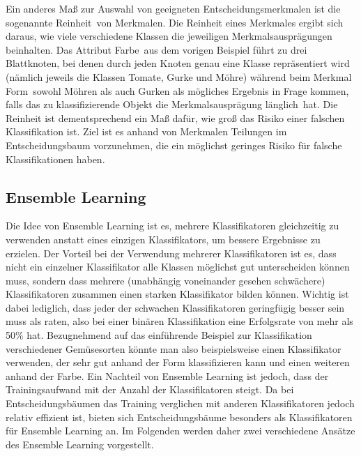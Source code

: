 Ein anderes Maß zur Auswahl von geeigneten Entscheidungsmerkmalen ist die sogenannte \glqq Reinheit\grqq\ von Merkmalen. Die Reinheit eines Merkmales ergibt sich daraus, wie viele verschiedene Klassen die jeweiligen Merkmalsausprägungen beinhalten. Das Attribut \glqq Farbe\grqq\ aus dem vorigen Beispiel führt zu drei Blattknoten, bei denen durch jeden Knoten genau eine Klasse repräsentiert wird (nämlich jeweils die Klassen Tomate, Gurke und Möhre) während beim Merkmal \glqq Form\grqq\ sowohl Möhren als auch Gurken als mögliches Ergebnis in Frage kommen, falls das zu klassifizierende Objekt die Merkmalsausprägung \glqq länglich\grqq\ hat. Die Reinheit ist dementsprechend ein Maß dafür, wie groß das Risiko einer falschen Klassifikation ist. Ziel ist es anhand von Merkmalen Teilungen im Entscheidungsbaum vorzunehmen, die ein möglichst geringes Risiko für falsche Klassifikationen haben.


\subsection{Ensemble Learning}
Die Idee von Ensemble Learning ist es, mehrere Klassifikatoren gleichzeitig zu verwenden anstatt eines einzigen Klassifikators, um bessere Ergebnisse zu erzielen. Der Vorteil bei der Verwendung mehrerer Klassifikatoren ist es, dass nicht ein einzelner Klassifikator alle Klassen möglichst gut unterscheiden können muss, sondern dass mehrere (unabhängig voneinander gesehen schwächere) Klassifikatoren zusammen einen starken Klassifikator bilden können. Wichtig ist dabei lediglich, dass jeder der schwachen Klassifikatoren geringfügig besser sein muss als raten, also bei einer binären Klassifikation eine Erfolgsrate von mehr als 50\% hat.
Bezugnehmend auf das einführende Beispiel zur Klassifikation verschiedener Gemüsesorten könnte man also beispielsweise einen Klassifikator verwenden, der sehr gut anhand der Form klassifizieren kann und einen weiteren anhand der Farbe. Ein Nachteil von Ensemble Learning ist jedoch, dass der Trainingsaufwand mit der Anzahl der Klassifikatoren steigt. Da bei Entscheidungsbäumen das Training verglichen mit anderen Klassifikatoren jedoch relativ effizient ist, bieten sich Entscheidungsbäume besonders als Klassifikatoren für Ensemble Learning an. Im Folgenden werden daher zwei verschiedene Ansätze des Ensemble Learning vorgestellt.


